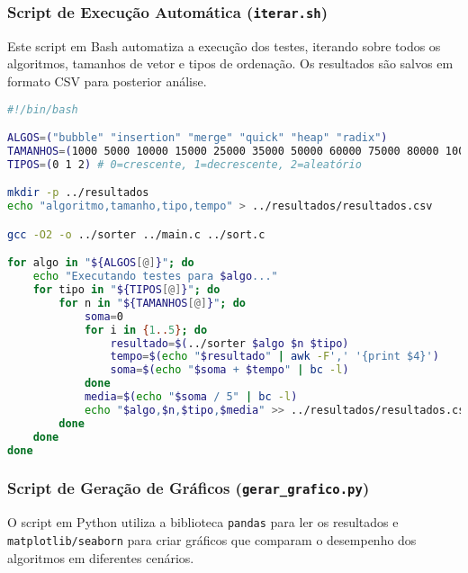 \subsubsection{Script de Execução Automática (\texttt{iterar.sh})}

Este script em Bash automatiza a execução dos testes, iterando sobre todos os algoritmos, tamanhos de vetor e tipos de ordenação. Os resultados são salvos em formato CSV para posterior análise.

\begin{lstlisting}[language=bash, caption={Script para automação dos testes}, label={lst:script}]
#!/bin/bash

ALGOS=("bubble" "insertion" "merge" "quick" "heap" "radix")
TAMANHOS=(1000 5000 10000 15000 25000 35000 50000 60000 75000 80000 100000)
TIPOS=(0 1 2) # 0=crescente, 1=decrescente, 2=aleatório

mkdir -p ../resultados
echo "algoritmo,tamanho,tipo,tempo" > ../resultados/resultados.csv

gcc -O2 -o ../sorter ../main.c ../sort.c

for algo in "${ALGOS[@]}"; do
    echo "Executando testes para $algo..."
    for tipo in "${TIPOS[@]}"; do
        for n in "${TAMANHOS[@]}"; do
            soma=0
            for i in {1..5}; do
                resultado=$(../sorter $algo $n $tipo)
                tempo=$(echo "$resultado" | awk -F',' '{print $4}')
                soma=$(echo "$soma + $tempo" | bc -l)
            done
            media=$(echo "$soma / 5" | bc -l)
            echo "$algo,$n,$tipo,$media" >> ../resultados/resultados.csv
        done
    done
done
\end{lstlisting}

\subsubsection{Script de Geração de Gráficos (\texttt{gerar\_grafico.py})}

O script em Python utiliza a biblioteca \texttt{pandas} para ler os resultados e \texttt{matplotlib/seaborn} para criar gráficos que comparam o desempenho dos algoritmos em diferentes cenários.

